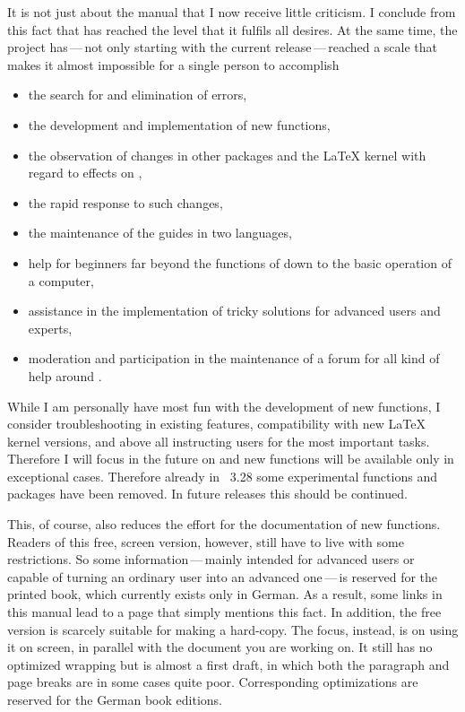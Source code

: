 It is not just about the manual that I now receive little criticism. I
conclude from this fact that \KOMAScript{} has reached the level that it
fulfils all desires. At the same time, the project has\,---\,not only starting
with the current release\,---\,reached a scale that makes it almost impossible
for a single person to accomplish
\begin{itemize}
\item the search for and elimination of errors,
\item the development and implementation of new functions,
\item the observation of changes in other packages and the \LaTeX{} kernel
  with regard to effects on \KOMAScript,
\item the rapid response to such changes,
\item the maintenance of the guides in two languages,
\item help for beginners far beyond the functions of \KOMAScript{} down to the
  basic operation of a computer,
\item assistance in the implementation of tricky solutions for advanced users
  and experts,
\item moderation and participation in the maintenance of a forum for all kind
  of help around \KOMAScript.
\end{itemize}
While I am personally have most fun with the development of new functions, I
consider troubleshooting in existing features, compatibility with new \LaTeX{}
kernel versions, and above all instructing users for the most important
tasks. Therefore I will focus in the future on and new functions will be
available only in exceptional cases. Therefore already in \KOMAScript~3.28
some experimental functions and packages have been removed. In future releases
this should be continued.

This, of course, also reduces the effort for the documentation of new
functions.  Readers of this free, screen version, however, still have to live
with some restrictions. So some information\,---\,mainly intended for advanced
users or capable of turning an ordinary user into an advanced one\,---\,is
reserved for the printed book, which currently exists only in German. As a
result, some links in this manual lead to a page that simply mentions this
fact. In addition, the free version is scarcely suitable for making a
hard-copy. The focus, instead, is on using it on screen, in parallel with the
document you are working on. It still has no optimized wrapping but is almost
a first draft, in which both the paragraph and page breaks are in some cases
quite poor. Corresponding optimizations are reserved for the German book
editions.

